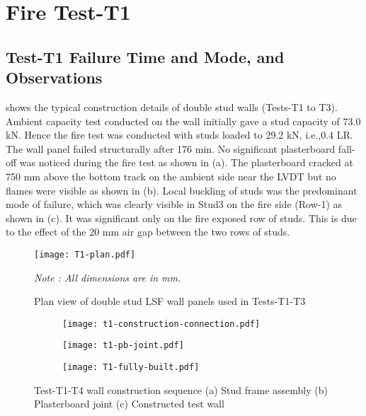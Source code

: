 \section{Fire Test-T1}
\subsection{Test-T1 Failure Time and Mode, and Observations}

 shows the typical construction details of double stud walls (Tests-T1 to T3). Ambient capacity test conducted on the wall initially gave a stud capacity of 73.0 kN. Hence the fire test was conducted with studs loaded to 29.2 kN, i.e.,0.4 LR. The wall panel failed structurally after 176 min. No significant plasterboard fall-off was noticed during the fire test as shown in  (a). The plasterboard cracked at 750 mm above the bottom track on the ambient side near the LVDT but no flames were visible as shown in  (b). Local buckling of studs was the predominant mode of failure, which was clearly visible in Stud3 on the fire side (Row-1) as shown in  (c). It was significant only on the fire exposed row of studs. This is due to the effect of the 20 mm air gap between the two rows of studs. 
\begin{figure}[htbp]
	\centering
	\texttt{[image: T1-plan.pdf]}
	\caption{Plan view of double stud LSF wall panels used in Tests-T1-T3}
	\label{fig:T1-plan}
	\fontsize{10}{1}\textit{Note : All dimensions are in mm.}
\end{figure}
\begin{figure}[!htbp]
	\centering
	\begin{subfigure}[b]{0.5\textwidth}
		\centering
		\texttt{[image: t1-construction-connection.pdf]}
		\caption{}
		\label{subfig:t1-construction-connection}
	\end{subfigure}
	\begin{subfigure}[b]{0.5\textwidth}
		\centering
		\texttt{[image: t1-pb-joint.pdf]}
		\caption{}
		\label{subfig:t1-pb-joint}
	\end{subfigure}
	\begin{subfigure}[b]{0.5\textwidth}
		\centering
		\texttt{[image: T1-fully-built.pdf]}
		\caption{}
		\label{subfig:T1-construction}
	\end{subfigure}
	   \caption{Test-T1-T4 wall construction sequence (a) Stud frame assembly (b) Plasterboard joint (c) Constructed test wall}
	   \label{fig:t1-construction-sequence}
\end{figure}
